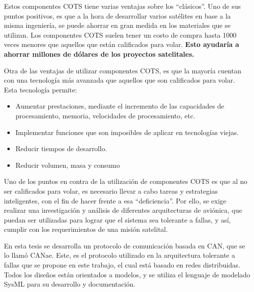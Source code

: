 Estos componentes COTS tiene varias ventajas sobre los ``clásicos''. Uno de sus puntos positivos,
es que a la hora de desarrollar varios satélites en base a la misma ingeniería, se puede ahorrar en gran medida en los materiales que se utilizan. Los componentes \ac{COTS}
suelen tener un costo de compra hasta 1000 
veces menores que aquellos que están calificados para volar. \textbf{Esto ayudaría a ahorrar 
 millones de dólares de los proyectos satelitales.}

Otra de las ventajas de utilizar componentes \ac{COTS}, es que la mayoría cuentan con una tecnología más avanzada que aquellos que son calificados para volar. Esta tecnología permite:
\begin{itemize}
 \item Aumentar prestaciones, mediante el incremento de las capacidades de procesamiento, memoria, 
velocidades de 
procesamiento, etc.
 \item Implementar funciones que son imposibles de aplicar en tecnologías viejas.
 \item Reducir tiempos de desarrollo.
 \item Reducir volumen, masa y consumo
\end{itemize}

Uno de los puntos en contra de la utilización de componentes \ac{COTS} es que al no ser calificados para volar, es necesario llevar a cabo tareas y estrategias inteligentes, con el fin de hacer frente a 
esa “deficiencia”. Por ello, se exige realizar una investigación y análisis de diferentes 
arquitecturas de aviónica, que puedan ser utilizadas para lograr que el sistema sea tolerante a 
fallas, y así, cumplir con los requerimientos de una misión satelital.

En esta tesis se desarrolla un protocolo de comunicación basada en CAN, que se lo llamó CANae.
Este, es el protocolo utilizado en la arquitectura tolerante a fallas que se propone en este
trabajo, el cual está basado en redes distribuidas. Todos los diseños están orientados a
modelos, y se utiliza el lenguaje de modelado  SysML para su desarrollo y documentación. 

